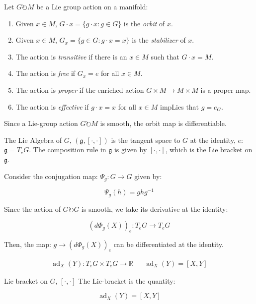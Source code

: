 \begin{defn}
\noindent Let $G \circlearrowright M$ be a Lie group action on a manifold:
\begin{enumerate}
    \item Given $x \in M$, $G \cdot x = \{g \cdot x: g \in G \}$ is the \textit{orbit} of $x$.
    \item Given $x \in M$, $G_{x} = \{g \in G: g \cdot x = x\}$ is the \textit{stabilizer} of $x$.
    \item The action is \textit{transitive} if there is an $x \in M$ such that $G \cdot x = M$.
    \item The action is \textit{free} if $G_{x} = e$ for all $x \in M$.
    \item The action is \textit{proper} if the enriched action $G \times M \to M \times M$ is a proper map.
    \item The action is \textit{effective} if $g \cdot x = x$ for all $x \in M$ impLies that $g = e_{G}$.
\end{enumerate}
\end{defn}

\noindent Since a Lie-group action $G \circlearrowright M$ is smooth, the orbit map is differentiable. 

\begin{defn}
The Lie Algebra of $G$, $(\mathfrak{g}, [ \cdot, \cdot])$ is the tangent space to $G$ at the identity, $e$: $\mathfrak{g} = T_{e} G$. The composition rule in $\mathfrak{g}$ is given by $[ \cdot, \cdot]$, which is the Lie bracket on $\mathfrak{g}$.
\end{defn}

\noindent Consider the conjugation map: $\Psi_{g}: G \to G$ given by:  

$$\Psi_{g}(h) = gh g^{-1}$$

\noindent Since the action of $G \circlearrowright G$ is smooth, we take its derivative at the identity:

$$\left(d \Phi_{g}(X)\right)_{e}: T_{e} G \to T_{e} G$$

\noindent Then, the map: $g \to \left(d \Phi_{g}(X)\right)_{e}$ can be differentiated at the identity.

\begin{align}
\operatorname{ad}_{X}(Y): T_{e} G \times T_{e} G \to \mathbb{R} && \operatorname{ad}_{X}(Y) = \left[X, Y \right]    
\end{align}

\begin{defn}{Lie bracket on $G$, $[ \cdot, \cdot ]$}
The Lie-bracket is the quantity: 

$$\operatorname{ad}_{X}(Y) = \left[X, Y \right]$$
\end{defn}

